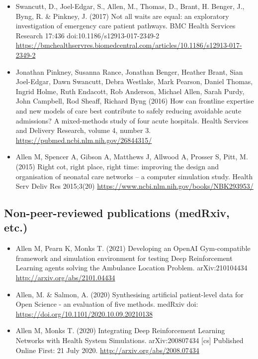 \begin{itemize}
    \item Swancutt, D., Joel-Edgar, S., Allen, M., Thomas, D., Brant, H. Benger, J., Byng, R. \& Pinkney, J. (2017) Not all waits are equal: an exploratory investigation of emergency care patient pathways. BMC Health Services Research 17:436 doi:10.1186/s12913-017-2349-2 \url{https://bmchealthservres.biomedcentral.com/articles/10.1186/s12913-017-2349-2}

    \item Jonathan Pinkney, Susanna Rance, Jonathan Benger, Heather Brant, Sian Joel-Edgar, Dawn Swancutt, Debra Westlake, Mark Pearson, Daniel Thomas, Ingrid Holme, Ruth Endacott, Rob Anderson, Michael Allen, Sarah Purdy, John Campbell, Rod Sheaff, Richard Byng (2016)  How can frontline expertise and new models of care best contribute to safely reducing avoidable acute admissions? A mixed-methods study of four acute hospitals. Health Services and Delivery Research, volume 4, number 3. \url{https://pubmed.ncbi.nlm.nih.gov/26844315/}

    \item Allen M, Spencer A, Gibson A, Matthews J, Allwood A, Prosser S, Pitt, M. (2015) Right cot, right place, right time: improving the design and organisation of neonatal care networks – a computer simulation study. Health Serv Deliv Res 2015;3(20) \url{https://www.ncbi.nlm.nih.gov/books/NBK293953/}

\end{itemize}

\subsection{Non-peer-reviewed publications (medRxiv, etc.)}

\begin{itemize}
    \item Allen M, Pearn K, Monks T. (2021) Developing an OpenAI Gym-compatible framework and simulation environment for testing Deep Reinforcement Learning agents solving the Ambulance Location Problem. arXiv:210104434 \url{http://arxiv.org/abs/2101.04434}
    
    \item Allen, M. \& Salmon, A. (2020) Synthesising artificial patient-level data for Open Science - an evaluation of five methods. medRxiv doi: \url{https://doi.org/10.1101/2020.10.09.20210138}

    \item Allen M, Monks T. (2020) Integrating Deep Reinforcement Learning Networks with Health System Simulations. arXiv:200807434 [cs] Published Online First: 21 July 2020. \url{http://arxiv.org/abs/2008.07434}
    
\end{itemize}


